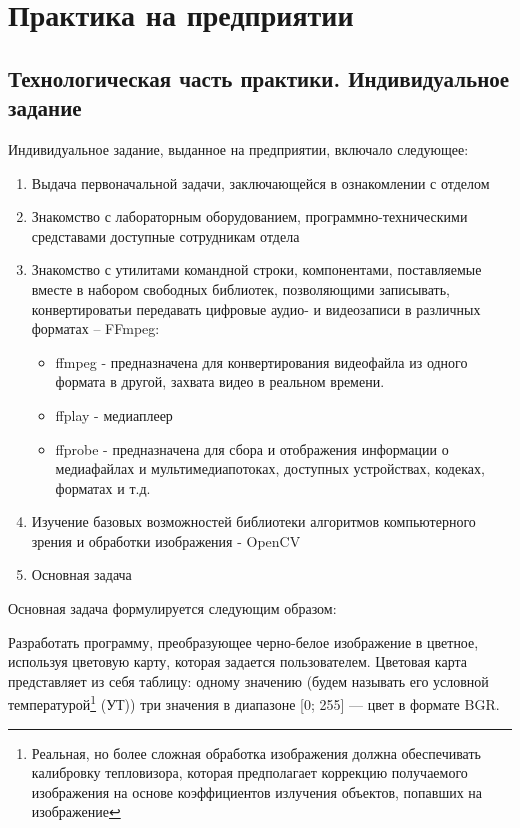 \chapter{Практика на предприятии}

\section{Технологическая часть практики. Индивидуальное задание}

Индивидуальное задание, выданное на предприятии, включало следующее:
\begin{enumerate}
	\item Выдача первоначальной задачи, заключающейся в ознакомлении с отделом
	\item Знакомство с лабораторным оборудованием, программно-техническими средставами доступные сотрудникам отдела
	\item Знакомство с утилитами командной строки, компонентами, поставляемые вместе в набором свободных библиотек, позволяющими записывать, конвертироватьи передавать цифровые аудио- и видеозаписи в различных форматах -- FFmpeg:
	\begin{itemize}
		\item ffmpeg - предназначена для конвертирования видеофайла из одного формата в другой, захвата видео в реальном времени. 
		\item ffplay - медиаплеер
		\item ffprobe - предназначена для сбора и отображения информации о медиафайлах и мультимедиапотоках, доступных устройствах, кодеках, форматах и т.д.
	\end{itemize}
	\item Изучение базовых возможностей библиотеки алгоритмов компьютерного зрения и обработки изображения - OpenCV
	\item Основная задача
\end{enumerate}

	Основная задача формулируется следующим образом:

	Разработать программу, преобразующее черно-белое изображение в цветное, используя цветовую карту, которая задается пользователем. 
	Цветовая карта представляет из себя таблицу: одному значению (будем называть его условной температурой\footnote{ Реальная, но более сложная обработка изображения должна обеспечивать калибровку тепловизора, которая предполагает коррекцию получаемого изображения на основе коэффициентов излучения объектов, попавших на изображение } (УТ)) три значения в диапазоне [0; 255] --- цвет в формате BGR.
	
